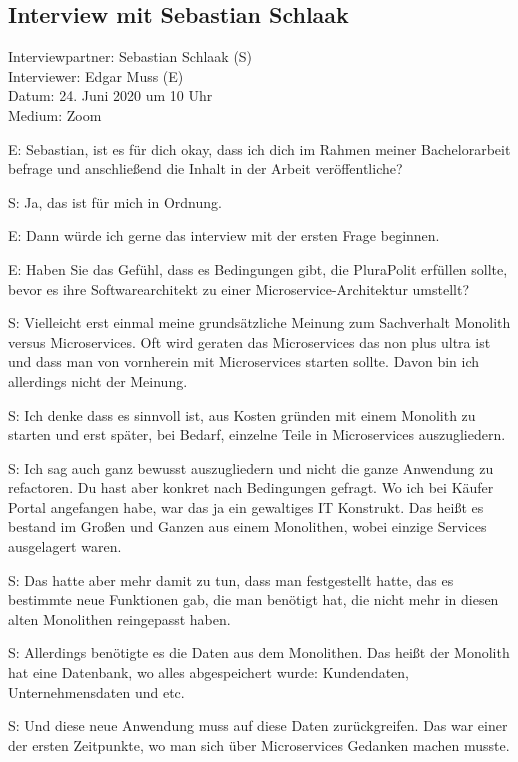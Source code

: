 
\subsection{Interview mit Sebastian Schlaak}
\label{appendix:schlaak}

Interviewpartner: Sebastian Schlaak (S) \\
Interviewer: Edgar Muss (E) \\
Datum: 24. Juni 2020 um 10 Uhr \\
Medium: Zoom

E: Sebastian, ist es für dich okay, dass ich dich im Rahmen meiner Bachelorarbeit befrage und anschließend die Inhalt in der Arbeit veröffentliche?

S: Ja, das ist für mich in Ordnung.

E: Dann würde ich gerne das interview mit der ersten Frage beginnen. 

E: Haben Sie das Gefühl, dass es Bedingungen gibt, die PluraPolit erfüllen sollte, bevor es ihre Softwarearchitekt zu einer Microservice-Architektur umstellt?

S: Vielleicht erst einmal meine grundsätzliche Meinung zum Sachverhalt Monolith versus Microservices. Oft wird geraten das Microservices das non plus ultra ist und dass man von vornherein mit Microservices starten sollte. Davon bin ich allerdings nicht der Meinung.

 \label{appendix:s-1}  \label{appendix:s-2}
S: Ich denke dass es sinnvoll ist, aus Kosten gründen mit einem Monolith zu starten und erst später, bei Bedarf, einzelne Teile in Microservices auszugliedern. 

S: Ich sag auch ganz bewusst auszugliedern und nicht die ganze Anwendung zu refactoren. Du hast aber konkret nach Bedingungen gefragt. Wo ich bei Käufer Portal angefangen habe, war das ja ein gewaltiges IT Konstrukt. Das heißt es bestand im Großen und Ganzen aus einem Monolithen, wobei einzige Services ausgelagert waren.

 \label{appendix:s-3}
S: Das hatte aber mehr damit zu tun, dass man festgestellt hatte, das es bestimmte neue Funktionen gab, die man benötigt hat, die nicht mehr in diesen alten Monolithen reingepasst haben. 

S: Allerdings benötigte es die Daten aus dem Monolithen. Das heißt der Monolith hat eine Datenbank, wo alles abgespeichert wurde: Kundendaten, Unternehmensdaten und etc.

 \label{appendix:s-4}
S: Und diese neue Anwendung muss auf diese Daten zurückgreifen. Das war einer der ersten Zeitpunkte, wo man sich über Microservices Gedanken machen musste.

